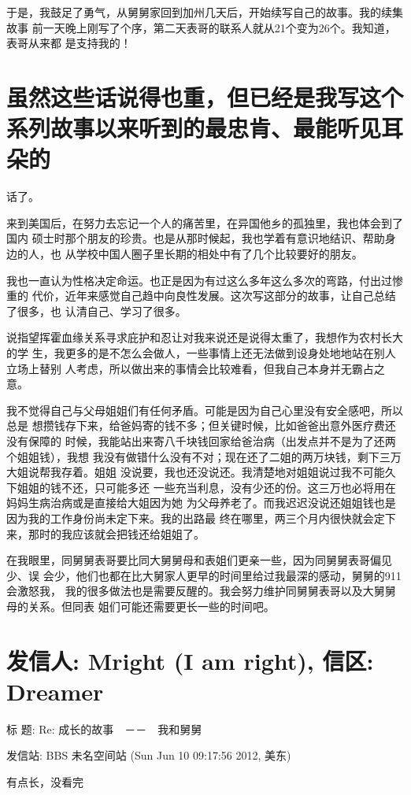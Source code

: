 \documentclass[12pt]{book}
\begin{document}
于是，我鼓足了勇气，从舅舅家回到加州几天后，开始续写自己的故事。我的续集故事
前一天晚上刚写了个序，第二天表哥的联系人就从21个变为26个。我知道，表哥从来都
是支持我的！
\section{虽然这些话说得也重，但已经是我写这个系列故事以来听到的最忠肯、最能听见耳朵的}
\label{sec-9-92}
话了。

来到美国后，在努力去忘记一个人的痛苦里，在异国他乡的孤独里，我也体会到了国内
硕士时那个朋友的珍贵。也是从那时候起，我也学着有意识地结识、帮助身边的人，也
从学校中国人圈子里长期的相处中有了几个比较要好的朋友。

我也一直认为性格决定命运。也正是因为有过这么多年这么多次的弯路，付出过惨重的
代价，近年来感觉自己趋中向良性发展。这次写这部分的故事，让自己总结了很多，也
认清自己、学习了很多。

说指望挥霍血缘关系寻求庇护和忍让对我来说还是说得太重了，我想作为农村长大的学
生，我更多的是不怎么会做人，一些事情上还无法做到设身处地地站在别人立场上替别
人考虑，所以做出来的事情会比较难看，但我自己本身并无霸占之意。

我不觉得自己与父母姐姐们有任何矛盾。可能是因为自己心里没有安全感吧，所以总是
想攒钱存下来，给爸妈寄的钱不多；但关键时候，比如爸爸出意外医疗费还没有保障的
时候，我能站出来寄八千块钱回家给爸治病（出发点并不是为了还两个姐姐钱），我想
我没有做错什么没有不对；现在还了二姐的两万块钱，剩下三万大姐说帮我存着。姐姐
没说要，我也还没说还。我清楚地对姐姐说过我不可能久下姐姐的钱不还，只可能多还
一些充当利息，没有少还的份。这三万也必将用在妈妈生病治病或是直接给大姐因为她
为父母养老了。而我迟迟没说还姐姐钱也是因为我的工作身份尚未定下来。我的出路最
终在哪里，两三个月内很快就会定下来，那时的我应该就会把钱还给姐姐了。

在我眼里，同舅舅表哥要比同大舅舅母和表姐们更亲一些，因为同舅舅表哥偏见少、误
会少，他们也都在比大舅家人更早的时间里给过我最深的感动，舅舅的911会激怒我，
我的很多做法也是需要反醒的。我会努力维护同舅舅表哥以及大舅舅母的关系。但同表
姐们可能还需要更长一些的时间吧。
\section{发信人: Mright (I am right), 信区: Dreamer}
\label{sec-9-93}

标  题: Re: 成长的故事　－－　我和舅舅

发信站: BBS 未名空间站 (Sun Jun 10 09:17:56 2012, 美东)

有点长，没看完
\end{document}
